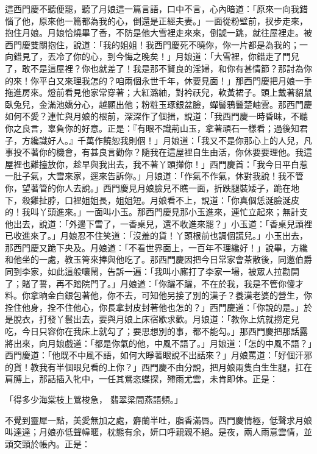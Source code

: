 \begin{showcontents}{}
這西門慶不聽便罷，聽了月娘這一篇言語，口中不言，心內暗道：「原來一向我錯惱了他，原來他一篇都為我的心，倒還是正經夫妻。」一面從粉壁前，扠步走來，抱住月娘。月娘恰燒畢了香，不防是他大雪裡走來來，倒諕一跳，就往屋裡走。被西門慶雙關抱住，說道：「我的姐姐！我西門慶死不曉你，你一片都是為我的；一向錯見了，丟冷了你的心，到今悔之晚矣！」月娘道：「大雪裡，你錯走了門兒了，敢不是這屋裡？你也就差了！我是那不賢良的淫婦，和你有甚情節？那討為你的來！你平白又來理我怎的？咱兩個永世千年，休要見面！」那西門慶把月娘一手拖進房來。燈前看見他家常穿著；大紅潞紬，對衿祆兒，軟黃裙子。頭上戴著貂鼠臥兔兒，金滿池嬌分心，越顯出他；粉粧玉琢銀盆臉，蟬髻鴉鬟楚岫雲。那西門慶如何不愛？連忙與月娘的根前，深深作了個揖，說道：「我西門慶一時昏昧，不聽你之良言，辜負你的好意。正是：『有眼不識荊山玉，拿著頑石一樣看；過後知君子，方纔識好人。』千萬作饒恕我則個！」月娘道：「我又不是你那心上的人兒，凡事投不著你的機會，有甚良言勸你？隨我在這屋裡自生由活，你休要要理他。我這屋裡也難擡放你，趁早與我出去，我不著丫頭攆你！」西門慶首：「我今日平白惹一肚子氣，大雪來家，逕來告訴你。」月娘道：「作氣不作氣，休對我說！我不管你，望著管的你人去說。」西門慶見月娘臉兒不瞧一面，折跌腿裝矮子，跪在地下，殺雞扯脖，口裡姐姐長，姐姐短。月娘看不上，說道：「你真個恁涎臉涎皮的！我叫丫頭進來。」一面叫小玉。那西門慶見那小玉進來，連忙立起來；無計支他出去，說道：「外邊下雪了，一香桌兒，還不收進來罷？」小玉道：「香桌兒頭裡已收進來了。」月娘忍不住笑道：「沒羞的貨！丫頭根前也調個謊兒。」小玉出去，那西門慶又跪下央及。月娘道：「不看世界面上，一百年不理纔好！」說畢，方纔和他坐的一處，教玉筲來捧與他吃了。那西門慶因把今日常家會茶散後，同邀伯爵同到李家，如此這般嚷鬧，告訴一遍：「我叫小廝打了李家一場，被眾人拉勸開了；賭了誓，再不踏院門了。」月娘道：「你躧不躧，不在於我，我是不管你傻才料。你拿晌金白銀包著他，你不去，可知他另接了別的漢子？養漢老婆的營生，你拴住他身，拴不住他心，你長拿封皮封著他也怎的？」西門慶道：「你說的是。」於是脫衣，打發丫鬟出去，要與月娘上床宿歇求歡。月娘道：「教你上炕就撈定兒吃，今日只容你在我床上就勾了；要思想別的事，都不能勾。」那西門慶把那話露將出來，向月娘戲道：「都是你氣的他，中風不語了。」月娘道：「怎的中風不語？」西門慶道：「他既不中風不語，如何大睜著眼說不出話來？」月娘罵道：「好個汗邪的貨！教我有半個眼兒看的上你？」西門慶不由分說，把月娘兩隻白生生腿，扛在肩膊上，那話插入牝中，一任其鶯恣蝶探，殢雨尤雲，未肯即休。正是：

「得多少海棠枝上鶯梭急， 翡翠梁間燕語頻。」

不覺到靈犀一點，美愛無加之處，麝蘭半吐，脂香滿唇。西門慶情極，低聲求月娘叫達達；月娘亦低聲幃暱，枕態有余，妍口呼親親不絕。是夜，兩人雨意雲情，並頭交頸於帳內。正是：


\end{showcontents}
